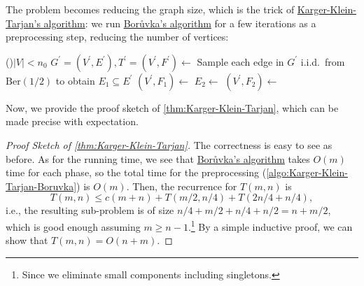 The problem becomes reducing the graph size, which is the trick of \hyperref[algo:Karger-Klein-Tarjan]{Karger-Klein-Tarjan's algorithm}: we run \hyperref[algo:Boruvka]{Borůvka's algorithm} for a few iterations as a preprocessing step, reducing the number of vertices:

\begin{algorithm}[H]\label{algo:Karger-Klein-Tarjan}
	\DontPrintSemicolon
	\caption{Karger-Klein-Tarjan's Algorithm~\cite{karger1995randomized}}
	\BlankLine
	\If(){\(\lvert V \rvert < n_0\)}{
	}
	\;
	\(G^{\prime} = (V^{\prime} , E^{\prime} ), T^{\prime} = (V^{\prime} , F^{\prime} )\gets\)\label{algo:Karger-Klein-Tarjan-Boruvka}
	\;
	Sample each edge in \(G^{\prime} \) i.i.d.\ from \(\mathrm{Ber} (1 / 2)\) to obtain \(E_1 \subseteq E^{\prime} \)\;
	\((V^{\prime} , F_1) \gets\)
	\(E_2 \gets\)
	\((V^{\prime} , F_2) \gets\)
	\;
\end{algorithm}

Now, we provide the proof sketch of \autoref{thm:Karger-Klein-Tarjan}, which can be made precise with expectation.

\begin{proof}[Proof Sketch of \autoref{thm:Karger-Klein-Tarjan}]
	The correctness is easy to see as before. As for the running time, we see that \hyperref[algo:Boruvka]{Borůvka's algorithm} takes \(O(m)\) time for each phase, so the total time for the preprocessing (\autoref{algo:Karger-Klein-Tarjan-Boruvka}) is \(O(m)\). Then, the recurrence for \(T(m, n)\) is
	\[
		T(m, n)
		\leq c(m+n) + T(m / 2, n / 4) + T(2n / 4 + n / 4),
	\]
	i.e., the resulting sub-problem is of size \(n / 4 + m / 2 + n / 4 + n / 2 = n + m / 2\), which is good enough assuming \(m \geq n - 1\).\footnote{Since we eliminate small components including singletons.} By a simple inductive proof, we can show that \(T(m, n) = O(n + m) \).
\end{proof}


